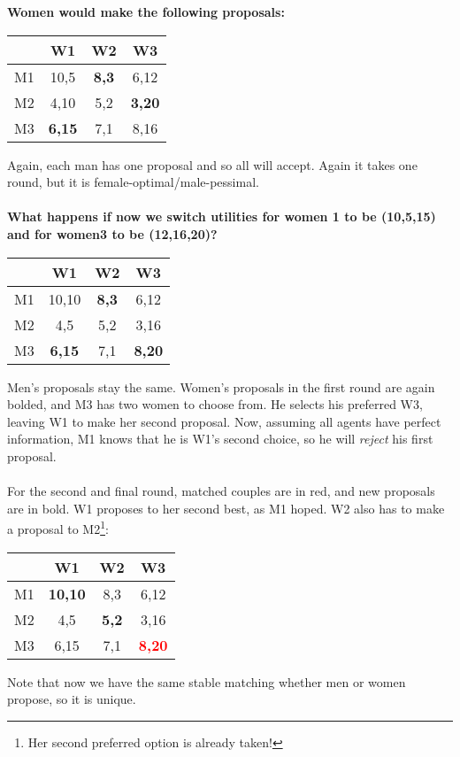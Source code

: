 \documentclass[]{article}
\begin{document}
\textbf{Women would make the following proposals:}
\begin{center}
\begin{tabular}{|c|c|c|c|}
\hline 
 & W1 & W2 & W3 \\ 
\hline 
M1 & 10,5 & \textbf{8,3} & 6,12 \\ 
\hline 
M2 & 4,10 & 5,2 & \textbf{3,20} \\  
\hline 
M3 & \textbf{6,15} & 7,1 & 8,16 \\ 
\hline 
\end{tabular}
\end{center}
Again, each man has one proposal and so all will accept. Again it takes one round, but it is female-optimal/male-pessimal. 
\\
\\
\textbf{What happens if now we switch utilities for women 1 to be (10,5,15) and for women3 to be (12,16,20)?}
 \begin{center}
\begin{tabular}{|c|c|c|c|}
\hline 
 & W1 & W2 & W3 \\ 
\hline 
M1 & 10,10 & \textbf{8,3} & 6,12 \\ 
\hline 
M2 & 4,5 & 5,2 & 3,16 \\  
\hline 
M3 & \textbf{6,15} & 7,1 & \textbf{8,20} \\ 
\hline 
\end{tabular}
\end{center}
Men's proposals stay the same. Women's proposals in the first round are again bolded, and M3 has two women to choose from. He selects his preferred W3, leaving W1 to make her second proposal. Now, assuming all agents have perfect information, M1 knows that he is W1's second choice, so he will \textit{reject} his first proposal. \\
\\
For the second and final round, matched couples are in red, and new proposals are in bold. W1 proposes to her second best, as M1 hoped. W2 also has to make a proposal to M2\footnote{Her second preferred option is already taken!}:
\begin{center}
\begin{tabular}{|c|c|c|c|}
\hline 
 & W1 & W2 & W3 \\ 
\hline 
M1 & \textbf{10,10} & 8,3 & 6,12 \\ 
\hline 
M2 & 4,5 & \textbf{5,2} & 3,16 \\  
\hline 
M3 & 6,15 & 7,1 & \textbf{\textcolor{red}{8,20}} \\ 
\hline 
\end{tabular}
\end{center}
Note that now we have the same stable matching whether men or women propose, so it is unique. 
\end{document}
